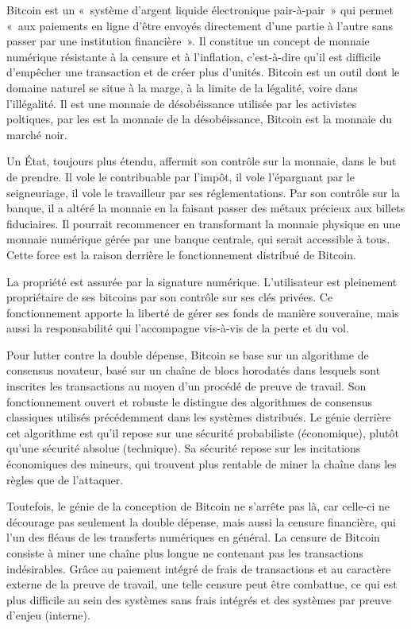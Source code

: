 Bitcoin est un «~système d'argent liquide électronique pair-à-pair~» qui permet «~aux paiements en ligne d'être envoyés directement d'une partie à l'autre sans passer par une institution financière~». Il constitue un concept de monnaie numérique résistante à la censure et à l'inflation, c'est-à-dire qu'il est difficile d'empêcher une transaction et de créer plus d'unités. Bitcoin est un outil dont le domaine naturel se situe à la marge, à la limite de la légalité, voire dans l'illégalité. Il est une monnaie de désobéissance utilisée par les activistes poltiques, par les  est la monnaie de la désobéissance, Bitcoin est la monnaie du marché noir.

Un État, toujours plus étendu, affermit son contrôle sur la monnaie, dans le but de prendre. Il vole le contribuable par l'impôt, il vole l'épargnant par le seigneuriage, il vole le travailleur par ses réglementations. Par son contrôle sur la banque, il a altéré la monnaie en la faisant passer des métaux précieux aux billets fiduciaires. Il pourrait recommencer en transformant la monnaie physique en une monnaie numérique gérée par une banque centrale, qui serait accessible à tous. Cette force est la raison derrière le fonctionnement distribué de Bitcoin.

La propriété est assurée par la signature numérique. L'utilisateur est pleinement propriétaire de ses bitcoins par son contrôle sur ses clés privées. Ce fonctionnement apporte la liberté de gérer ses fonds de manière souveraine, mais aussi la responsabilité qui l'accompagne vis-à-vis de la perte et du vol.

Pour lutter contre la double dépense, Bitcoin se base sur un algorithme de consensus novateur, basé sur un chaîne de blocs horodatés dans lesquels sont inscrites les transactions au moyen d'un procédé de preuve de travail. Son fonctionnement ouvert et robuste le distingue des algorithmes de consensus classiques utilisés précédemment dans les systèmes distribués. Le génie derrière cet algorithme est qu'il repose sur une sécurité probabiliste (économique), plutôt qu'une sécurité absolue (technique). Sa sécurité repose sur les incitations économiques des mineurs, qui trouvent plus rentable de miner la chaîne dans les règles que de l'attaquer.

Toutefois, le génie de la conception de Bitcoin ne s'arrête pas là, car celle-ci ne décourage pas seulement la double dépense, mais aussi la censure financière, qui l'un des fléaus de les transferts numériques en général. La censure de Bitcoin consiste à miner une chaîne plus longue ne contenant pas les transactions indésirables. Grâce au paiement intégré de frais de transactions et au caractère externe de la preuve de travail, une telle censure peut être combattue, ce qui est plus difficile au sein des systèmes sans frais intégrés et des systèmes par preuve d'enjeu (interne).

